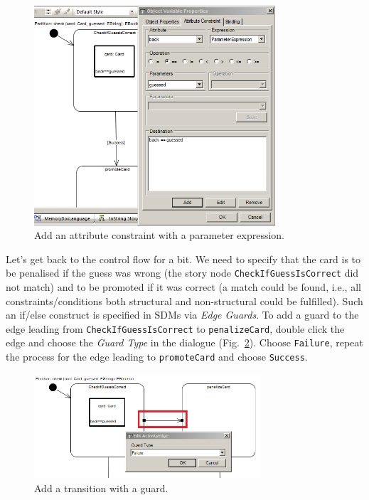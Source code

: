 \begin{figure}[htbp] 
\begin{center}
  \includegraphics[width=0.8\textwidth]{pics/sdmBilder/check/sdm18RAW}
  \caption{Add an attribute constraint with a parameter expression.}  
  \label{fig:sdm_check_att_constraint}
\end{center}
\end{figure} 

Let's get back to the control flow for a bit.  We need to specify that the card
is to be penalised if the guess was wrong (the story node
\texttt{Check\-If\-Guess\-Is\-Correct} did not match) and to be promoted if it
was correct (a match could be found, i.e., all constraints/conditions both
structural and non-structural could be fulfilled).  Such an if/else construct is
specified in SDMs via \emph{Edge Guards}.  To add a guard to the edge leading
from \texttt{Check\-If\-Guess\-Is\-Correct} to \texttt{penalize\-Card}, double
click the edge and choose the \emph{Guard Type} in the dialogue
(Fig.~\ref{fig:sdm_check_guard}).  Choose \texttt{Failure}, repeat the process
for the edge leading to \texttt{promoteCard} and choose \texttt{Success}.

\begin{figure}[htbp]
\begin{center}
  \includegraphics[width=0.75\textwidth]{pics/sdmBilder/check/sdm19}
  \caption{Add a transition with a guard.}  
  \label{fig:sdm_check_guard}
\end{center}
\end{figure}


